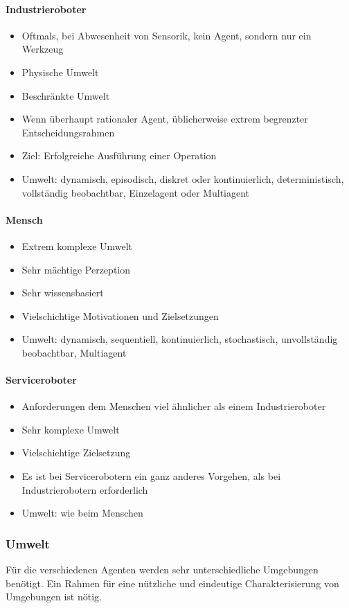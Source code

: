 \paragraph{Industrieroboter}
\begin{itemize}
	\item Oftmals, bei Abwesenheit von Sensorik, kein Agent, sondern nur ein Werkzeug
	\item Physische Umwelt
	\item Beschränkte Umwelt
	\item Wenn überhaupt rationaler Agent, üblicherweise extrem begrenzter Entscheidungsrahmen
	\item Ziel: Erfolgreiche Ausführung einer Operation
	\item Umwelt: dynamisch, episodisch, diskret oder kontinuierlich, deterministisch, vollständig beobachtbar, Einzelagent oder Multiagent
\end{itemize}
\paragraph{Mensch}
\begin{itemize}
	\item Extrem komplexe Umwelt
	\item Sehr mächtige Perzeption
	\item Sehr wissensbasiert
	\item Vielschichtige Motivationen und Zielsetzungen
	\item Umwelt: dynamisch, sequentiell, kontinuierlich, stochastisch, unvollständig beobachtbar, Multiagent
\end{itemize}
\paragraph{Serviceroboter}
\begin{itemize}
	\item Anforderungen dem Menschen viel ähnlicher als einem Industrieroboter
	\item Sehr komplexe Umwelt
	\item Vielschichtige Zielsetzung
	\item Es ist bei Servicerobotern ein ganz anderes Vorgehen, als bei Industrierobotern erforderlich
	\item Umwelt: wie beim Menschen
\end{itemize}

\subsubsection{Umwelt}
Für die verschiedenen Agenten werden sehr unterschiedliche Umgebungen benötigt.
Ein Rahmen für eine nützliche und eindeutige Charakterisierung von Umgebungen ist nötig.
